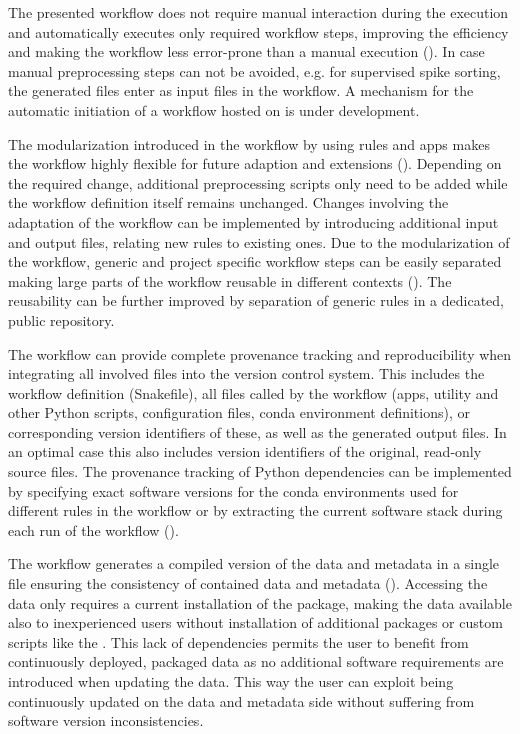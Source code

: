 The presented workflow does not require manual interaction during the execution and automatically executes only required workflow steps, improving the efficiency and making the workflow less error-prone than a manual execution (). In case manual preprocessing steps can not be avoided, e.g. for supervised spike sorting, the generated files enter as input files in the workflow. A mechanism for the automatic initiation of a  workflow hosted on  is under development.

The modularization introduced in the workflow by using  rules and apps makes the workflow highly flexible for future adaption and extensions (). Depending on the required change, additional preprocessing scripts only need to be added while the workflow definition itself remains unchanged. Changes involving the adaptation of the workflow can be implemented by introducing additional input and output files, relating new  rules to existing ones.
Due to the modularization of the workflow, generic and project specific workflow steps can be easily separated making large parts of the workflow reusable in different contexts (). The reusability can be further improved by separation of generic rules in a dedicated, public repository.

The workflow can provide complete provenance tracking and reproducibility when integrating all involved files into the version control system. This includes the workflow definition (Snakefile), all files called by the workflow (apps, utility and other Python scripts, configuration files, conda environment definitions), or corresponding version identifiers of these,  as well as the generated output files. In an optimal case this also includes version identifiers of the original, read-only source files. The provenance tracking of Python dependencies can be implemented by specifying exact software versions for the conda environments used for different rules in the workflow or by extracting the current software stack during each run of the workflow ().

The workflow generates a compiled version of the data and metadata in a single  file ensuring the consistency of contained data and metadata (). Accessing the data only requires a current installation of the  package, making the data available also to inexperienced users without installation of additional packages or custom scripts like the . This lack of dependencies permits the user to benefit from continuously deployed, packaged data as no additional software requirements are introduced when updating the data. This way the user can exploit being continuously updated on the data and metadata side without suffering from software version inconsistencies.

